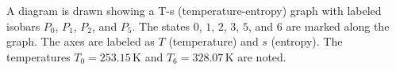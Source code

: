 A diagram is drawn showing a T-s (temperature-entropy) graph with labeled isobars \( P_0 \), \( P_1 \), \( P_2 \), and \( P_5 \). The states \( 0 \), \( 1 \), \( 2 \), \( 3 \), \( 5 \), and \( 6 \) are marked along the graph. The axes are labeled as \( T \) (temperature) and \( s \) (entropy). The temperatures \( T_0 = 253.15 \, \text{K} \) and \( T_6 = 328.07 \, \text{K} \) are noted.
